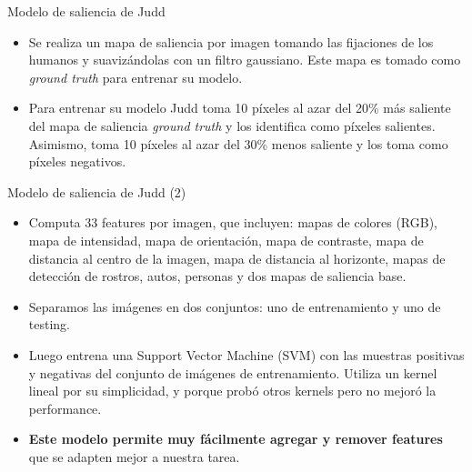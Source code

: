\documentclass[compress]{beamer}
\begin{document}
\begin{frame}{Modelo de saliencia de Judd}
\begin{itemize}
\item Se realiza un mapa de saliencia por imagen tomando las fijaciones de los humanos y suavizándolas con un filtro gaussiano. Este mapa es tomado como \textit{ground truth} para entrenar su modelo.
\item Para entrenar su modelo Judd toma 10 píxeles al azar del 20\% más saliente del mapa de saliencia  \textit{ground truth} y los identifica como píxeles salientes. Asimismo, toma 10 píxeles al azar del 30\% menos saliente y los toma como píxeles negativos.
\end{itemize}
\end{frame}

\begin{frame}{Modelo de saliencia de Judd (2)}
\begin{itemize}
\item Computa 33 features por imagen, que incluyen: mapas de colores (RGB), mapa de intensidad, mapa de orientación, mapa de contraste, mapa de distancia al centro de la imagen, mapa de distancia al horizonte, mapas de detección de rostros, autos, personas y dos mapas de saliencia base.
\item Separamos las imágenes en dos conjuntos: uno de entrenamiento y uno de testing. 
\item Luego entrena una Support Vector Machine (SVM) con las muestras positivas y negativas del conjunto de imágenes de entrenamiento. Utiliza un kernel lineal por su simplicidad, y porque probó otros kernels pero no mejoró la performance.
\item \textbf{Este modelo permite muy fácilmente agregar y remover features} que se adapten mejor a nuestra tarea.
\end{itemize}
\end{frame}
\end{document}
